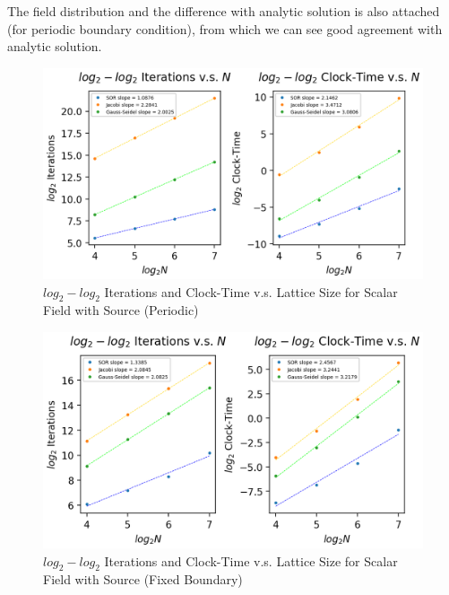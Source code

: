 \documentclass[a4paper,10pt]{article}
\begin{document}
\begin{large}
The field distribution and the difference with analytic solution is also attached (for periodic boundary condition), from which we can see good agreement with analytic solution.
\begin{figure}[htbp] %
\centering %
\includegraphics[width=15cm]{Problem_3_lattice_size_v.s.iterations_clock-time_with_Charge_Periodic.png} %
\caption{$log_2-log_2$ Iterations and Clock-Time v.s. Lattice Size for Scalar Field with Source (Periodic)}
\end{figure}

\begin{figure}[htbp] %
\centering %
\includegraphics[width=15cm]{Problem_3_lattice_size_v.s.iterations_clock-time_with_Charge_Fixed_Boundary.png} %
\caption{$log_2-log_2$ Iterations and Clock-Time v.s. Lattice Size for Scalar Field with Source (Fixed Boundary)}
\end{figure}


\end{large}
\end{document}
